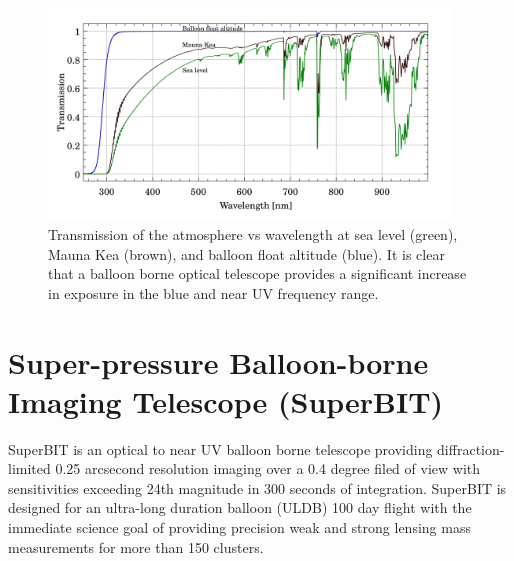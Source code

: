\begin{figure}
    \begin{small}
        \begin{center}
            \includegraphics[width=0.95\textwidth]{Introduction/figs/atmosphere.jpg}
        \end{center}
        \caption{Transmission of the atmosphere vs wavelength at sea level (green), Mauna Kea (brown), and balloon float altitude (blue). It is clear that a balloon borne optical telescope provides a significant increase in exposure in the blue and near UV frequency range.}
        \label{fig:atmos}
    \end{small}
\end{figure}


\section{Super-pressure Balloon-borne Imaging Telescope (SuperBIT)}
SuperBIT is an optical to near UV balloon borne telescope providing diffraction-limited 0.25 arcsecond resolution imaging over a 0.4 degree filed of view with sensitivities exceeding 24th magnitude in 300 seconds of integration. SuperBIT is designed for an ultra-long duration balloon (ULDB) 100 day flight with the immediate science goal of providing precision weak and strong lensing mass measurements for more than 150 clusters.

